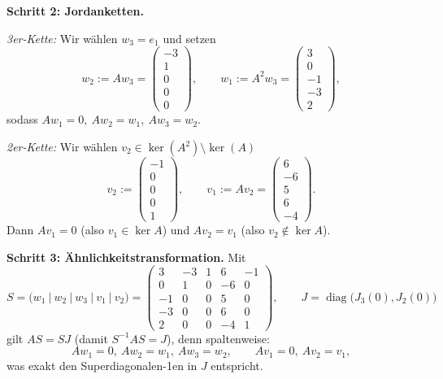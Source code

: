 \documentclass[11pt, a4paper]{article}
\begin{document}
\medskip
\textbf{Schritt 2: Jordan\-ketten.}

\emph{3er-Kette:} Wir wählen \(w_3=e_1\) und setzen
\[
w_2:=A w_3=\begin{pmatrix}-3\\1\\0\\0\\0\end{pmatrix},\qquad
w_1:=A^2 w_3=\begin{pmatrix}3\\0\\-1\\-3\\2\end{pmatrix},
\]
sodass \(A w_1=0,\ A w_2=w_1,\ A w_3=w_2\).

\medskip
\emph{2er-Kette:} Wir wählen \(v_2\in\ker(A^2)\setminus\ker(A)\)
\[
v_2:=\begin{pmatrix}-1\\0\\0\\0\\1\end{pmatrix},\qquad
v_1:=A v_2=\begin{pmatrix}6\\-6\\5\\6\\-4\end{pmatrix}.
\]
Dann \(A v_1=0\) (also \(v_1\in\ker A\)) und \(A v_2=v_1\) (also $v_2\notin\ker A$).

\medskip
\textbf{Schritt 3: Ähnlichkeitstransformation.}
Mit
\[
S=\bigl(w_1\ \big|\ w_2\ \big|\ w_3\ \big|\ v_1\ \big|\ v_2\bigr)=
\begin{pmatrix}
  3 & -3 & 1 &  6 & -1\\
  0 &  1 & 0 & -6 &  0\\
 -1 &  0 & 0 &  5 &  0\\
 -3 &  0 & 0 &  6 &  0\\
  2 &  0 & 0 & -4 &  1
\end{pmatrix},\qquad
J=\operatorname{diag}\!\big(J_3(0),J_2(0)\big)
\]
gilt \(AS=SJ\) (damit \(S^{-1}AS=J\)), denn spaltenweise:
\[
A w_1=0,\ A w_2=w_1,\ A w_3=w_2,\qquad A v_1=0,\ A v_2=v_1,
\]
was exakt den Superdiagonalen-1en in \(J\) entspricht.
\end{document}
